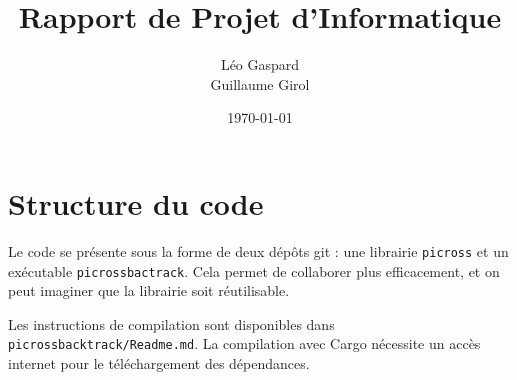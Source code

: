 \documentclass[11pt]{article}
\title{Rapport de Projet d'Informatique}
\date{\today}
\author{%
    L\'eo Gaspard\\
    Guillaume Girol
}
\begin{document}
\maketitle{}

\tableofcontents

\section{Structure du code}

Le code se présente sous la forme de deux dépôts git : une librairie \texttt{picross} et un exécutable \texttt{picrossbactrack}. Cela permet de collaborer plus efficacement, et on peut imaginer que la librairie soit réutilisable.

Les instructions de compilation sont disponibles dans \texttt{picrossbacktrack/Readme.md}. La compilation avec Cargo nécessite un accès internet pour le téléchargement des dépendances.



\end{document}
